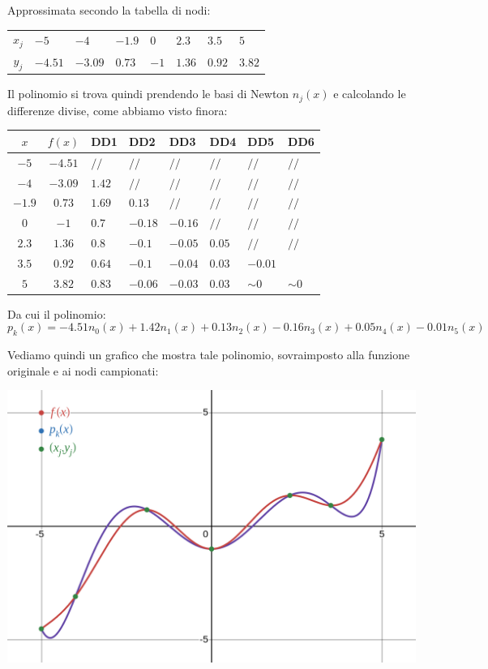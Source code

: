 \documentclass[a4paper,11pt]{article}
\begin{document}
\newpage

Approssimata secondo la tabella di nodi:
\begin{table}[H]
	\center
	\begin{tabular} { c | p{1cm} p{1cm} p{1cm} p{1cm} p{1cm} p{1cm} p{1cm} }
		$x_j$ & $-5$ & $-4$ & $-1.9$ & $0$ & $2.3$ & $3.5$ & $5$ \\
		$y_j$ & $-4.51$ & $-3.09$ & $0.73$ & $-1$ & $1.36$ & $0.92$ & $3.82$
	\end{tabular}
\end{table}

Il polinomio si trova quindi prendendo le basi di Newton $n_j(x)$ e calcolando le differenze divise, come abbiamo visto finora:

\begin{table}[H]
	\center 
	\begin{tabular} { c | c | p{1cm} p{1cm} p{1cm} p{1cm} p{1cm} p{1cm} }
		$x$ & $f(x)$ & DD1 & DD2 & DD3 & DD4 & DD5 & DD6 \\
		\hline
		$-5 $ & $ -4.51 $ & $ // $ & $ // $ & $ // $ & $ // $ & $ // $ & $ // $ \\
		$-4 $ & $ -3.09 $ & $ 1.42 $ & $ // $ & $ // $ & $ // $ & $ // $ & $ // $ \\
		$-1.9 $ & $ 0.73 $ & $ 1.69 $ & $ 0.13 $ & $ // $ & $ // $ & $ // $ & $ // $ \\
		$0 $ & $ -1 $ & $ 0.7 $ & $ -0.18 $ & $ -0.16 $ & $ // $ & $ // $ & $ // $ \\
		$2.3 $ & $ 1.36 $ & $ 0.8 $ & $ -0.1 $ & $ -0.05 $ & $ 0.05 $ & $ // $ & $ // $ \\
		$3.5 $ & $ 0.92 $ & $ 0.64 $ & $ -0.1 $ & $ -0.04 $ & $ 0.03 $ & $ -0.01 $ \\
		$5 $ & $ 3.82 $ & $ 0.83 $ & $ -0.06 $ & $ -0.03 $ & $ 0.03 $ & $ \sim0 $ & $ \sim0$ 
	\end{tabular}
\end{table}

Da cui il polinomio:
$$
p_k(x) = -4.51 n_0(x) + 1.42 n_1(x) + 0.13 n_2(x) - 0.16 n_3(x) + 0.05 n_4(x) - 0.01 n_5(x)
$$

Vediamo quindi un grafico che mostra tale polinomio, sovraimposto alla funzione originale e ai nodi campionati:

\begin{center}
	\includegraphics[scale=0.3]{../figures/newton_interpol.png}
\end{center}
\end{document}
